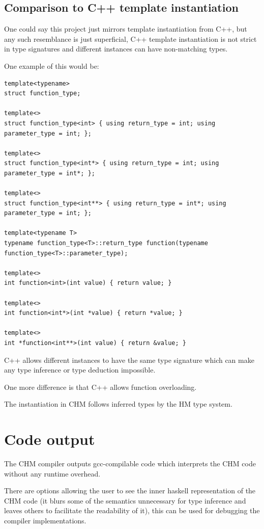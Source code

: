 \subsection{Comparison to C++ template instantiation}

One could say this project just mirrors template instantiation from C++, but any such resemblance is just superficial, C++ template instantiation is not strict in type signatures and different instances can have
non-matching types.

One example of this would be:


\begin{lstlisting}
template<typename>
struct function_type;

template<>
struct function_type<int> { using return_type = int; using parameter_type = int; };

template<>
struct function_type<int*> { using return_type = int; using parameter_type = int*; };

template<>
struct function_type<int**> { using return_type = int*; using parameter_type = int; };

template<typename T>
typename function_type<T>::return_type function(typename function_type<T>::parameter_type);

template<>
int function<int>(int value) { return value; }

template<>
int function<int*>(int *value) { return *value; }

template<>
int *function<int**>(int value) { return &value; }
\end{lstlisting}

C++ allows different instances to have the same type signature which can make any type inference or type deduction
impossible.

One more difference is that C++ allows function overloading. %

The instantiation in CHM follows inferred types by the HM type system.

\section{Code output}

The CHM compiler outputs gcc-compilable code which interprets the CHM code without any runtime overhead. %

There are options allowing the user to see the inner haskell representation of the CHM code (it blurs some of the semantics unnecessary for type inference and leaves others to facilitate the readability of it), this can be used for debugging the compiler implementations. %

